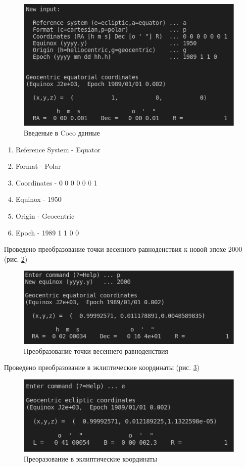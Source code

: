 \documentclass[14pt,a4paper]{extarticle}%
\begin{document}
\begin{figure}[H]
  \centering
  \includegraphics[scale=1.0]{input.png}
  \caption{Введеные в Coco данные}
  \label{fig:input}
\end{figure}

\begin{enumerate}
  \item Reference System - Equator
  \item Format - Polar
  \item Coordinates - 0 0 0 0 0 0 1
  \item Equinox - 1950
  \item Origin - Geocentric
  \item Epoch - 1989 1 1 0 0
\end{enumerate}

Проведено преобразование точки весенного равноденствия к новой эпохе 2000
(рис. \ref{fig:new_equinox})

\begin{figure}[H]
  \centering
  \includegraphics[scale=1.0]{new_equinox.png}
  \caption{Преобразование точки весеннего равноденствия}
  \label{fig:new_equinox}
\end{figure}

Проведено преобразование в эклиптические координаты (рис. \ref{fig:ecl})

\begin{figure}[H]
  \centering
  \includegraphics[scale=1.0]{ecliptic.png}
  \caption{Преоразование в эклиптические координаты}
  \label{fig:ecl}
\end{figure}
\end{document}
